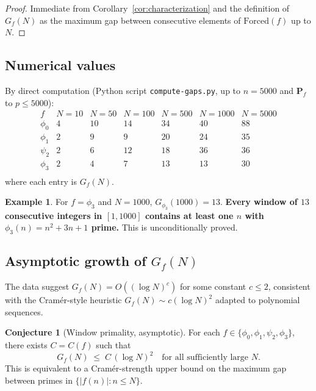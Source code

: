 \documentclass[11pt]{article}
\theoremstyle{definition}
\newtheorem{example}[theorem]{Example}
\newtheorem{conjecture}[theorem]{Conjecture}
\newcommand{\PP}{\mathbf{P}}
\newcommand{\Forced}{\mathrm{Forced}}
\begin{document}
\begin{proof}
Immediate from Corollary~\ref{cor:characterization} and the definition of $G_f(N)$ as the maximum gap between consecutive elements of $\Forced(f)$ up to $N$.
\end{proof}

\subsection{Numerical values}

By direct computation (Python script \texttt{compute-gaps.py}, up to $n = 5000$ and $\PP_f$ to $p \le 5000$):
\[
\begin{array}{l|cccccc}
f & N=10 & N=50 & N=100 & N=500 & N=1000 & N=5000 \\
\hline
\phi_0 & 4 & 10 & 14 & 34 & 40 & 88 \\
\phi_1 & 2 & 9 & 9 & 20 & 24 & 35 \\
\psi_2 & 2 & 6 & 12 & 18 & 36 & 36 \\
\phi_3 & 2 & 4 & 7 & 13 & 13 & 30 \\
\end{array}
\]
where each entry is $G_f(N)$.

\begin{example}\label{ex:phi3-windows}
For $f = \phi_3$ and $N = 1000$, $G_{\phi_3}(1000) = 13$. \textbf{Every window of $13$ consecutive integers in $[1, 1000]$ contains at least one $n$ with $\phi_3(n) = n^2+3n+1$ prime.} This is unconditionally proved.
\end{example}

\subsection{Asymptotic growth of $G_f(N)$}

The data suggest $G_f(N) = O((\log N)^c)$ for some constant $c \le 2$, consistent with the Cram\'er-style heuristic $G_f(N) \sim c (\log N)^2$ adapted to polynomial sequences.

\begin{conjecture}[Window primality, asymptotic]\label{conj:window-asymp}
For each $f \in \{\phi_0,\phi_1,\psi_2,\phi_3\}$, there exists $C = C(f)$ such that
\[
G_f(N) \;\le\; C \, (\log N)^2 \quad \text{for all sufficiently large } N.
\]
This is equivalent to a Cram\'er-strength upper bound on the maximum gap between primes in $\{|f(n)| : n \le N\}$.
\end{conjecture}
\end{document}
